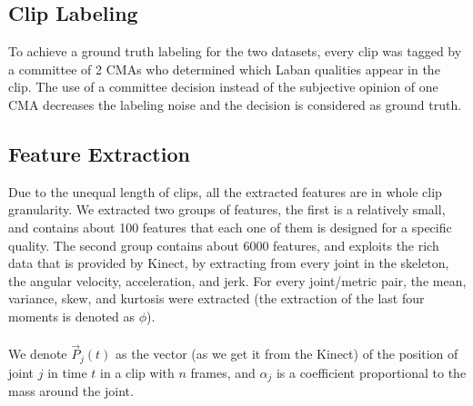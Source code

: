 \documentclass[journal]{journal}
\begin{document}
\subsection{Clip Labeling}
To achieve a ground truth labeling for the two datasets, every clip was tagged by
a committee of 2 CMAs who determined which Laban qualities appear in the
clip. The use of a committee decision instead of the subjective opinion of one
CMA decreases the labeling noise and the decision is considered as ground truth.
\subsection{Feature Extraction}
Due to the unequal length of clips, all the extracted features are in whole clip 
granularity. We extracted two groups of features, the first is a relatively
small, and contains about 100 features that each one of them is designed for a
specific quality. The second group contains about 6000 features, and exploits the rich data that
is provided by Kinect, by extracting from every joint in the skeleton, the
angular velocity, acceleration, and jerk. For every joint/metric pair, the mean,
variance, skew, and kurtosis were extracted (the extraction of the last four moments is denoted as $\phi$).
\\\\We denote $\vec{P}_{j}(t)$ as the vector (as we get it from the Kinect) of
the position of joint $j$ in time $t$ in a clip with $n$ frames, and
$\alpha_{j}$ is a coefficient proportional to the mass around the joint.
\end{document}
